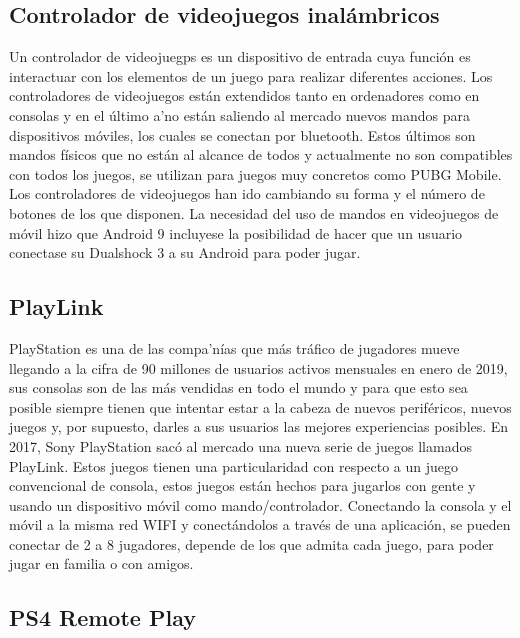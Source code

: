 \subsection{Controlador de videojuegos inal\'ambricos}
\label{cap2:subsec:GamePad}

Un controlador de videojuegps es un dispositivo de entrada cuya funci\'on es interactuar con los elementos de un juego para realizar diferentes acciones. Los controladores de videojuegos est\'an extendidos tanto en ordenadores como en consolas y en el \'ultimo a'no est\'an saliendo al mercado nuevos mandos para dispositivos m\'oviles, los cuales se conectan por bluetooth. Estos \'ultimos son mandos f\'isicos que no est\'an al alcance de todos y actualmente no son compatibles con todos los juegos, se utilizan para juegos muy concretos como PUBG Mobile. Los controladores de videojuegos han ido cambiando su forma y el n\'umero de botones de los que disponen. La necesidad del uso de mandos en videojuegos de m\'ovil hizo que Android 9 incluyese la posibilidad de hacer que un usuario conectase su Dualshock 3 a su Android para poder jugar.

\subsection{PlayLink}
\label{cap2:subsec:PlayLink}

PlayStation es una de las compa'n\'ias que m\'as tr\'afico de jugadores mueve llegando a la cifra de 90 millones de usuarios activos mensuales en enero de 2019, sus consolas son de las m\'as vendidas en todo el mundo y para que esto sea posible siempre tienen que intentar estar a la cabeza de nuevos perif\'ericos, nuevos juegos y, por supuesto, darles a sus usuarios las mejores experiencias posibles. En 2017, Sony PlayStation sac\'o al mercado una nueva serie de juegos llamados PlayLink. Estos juegos tienen una particularidad con respecto a un juego convencional de consola, estos juegos est\'an hechos para jugarlos con gente y usando un dispositivo m\'ovil como mando/controlador. Conectando la consola y el m\'ovil a la misma red WIFI y conect\'andolos a trav\'es de una aplicaci\'on, se pueden conectar de 2 a 8 jugadores, depende de los que admita cada juego, para poder jugar en familia o con amigos.

\subsection{PS4 Remote Play}
\label{cap2:subsec:ps4-remote-play}

